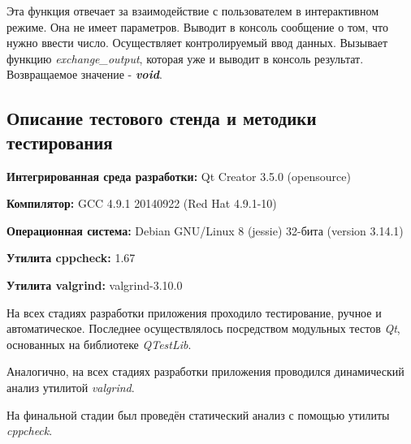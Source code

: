 \documentclass[12pt,a4paper]{report}
\begin{document}
\begin{enumerate}
\begin{itemize}
Эта функция отвечает за взаимодействие с пользователем в интерактивном режиме. Она не имеет параметров. Выводит в консоль сообщение о том, что нужно ввести число. Осуществляет контролируемый ввод данных. Вызывает функцию \textit{exchange\_output}, которая уже и выводит в консоль результат. Возвращаемое значение - \textit{\textbf{void}}.
\end{itemize}
\end{enumerate}
\subsection{Описание тестового стенда и методики тестирования}

\begin{flushleft}
\textbf{Интегрированная среда разработки:} Qt Creator 3.5.0 (opensource)

\textbf{Компилятор:} GCC 4.9.1 20140922 (Red Hat 4.9.1-10)

\textbf{Операционная система:} Debian GNU/Linux 8 (jessie) 32-бита (version 3.14.1)

\textbf{Утилита cppcheck:} 1.67

\textbf{Утилита valgrind:} valgrind-3.10.0
\end{flushleft}

На всех стадиях разработки приложения проходило тестирование, ручное и автоматическое. Последнее осуществлялось посредством модульных тестов \textit{Qt}, основанных на библиотеке  \textit{QTestLib}. 

Аналогично, на всех стадиях разработки приложения проводился динамический анализ утилитой \textit{valgrind}.

На финальной стадии был проведён статический анализ с помощью утилиты \textit{cppcheck}.
\end{document}
